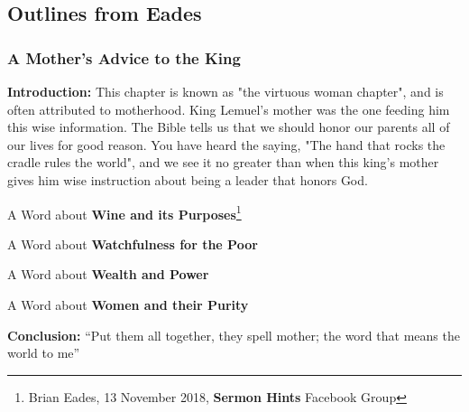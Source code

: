 \subsection{Outlines from Eades}


\subsubsection{A Mother's Advice to the King}

\textbf{Introduction: }This chapter is known as "the virtuous woman chapter", and is often attributed to motherhood. King Lemuel's mother was the one feeding him this wise information. The Bible tells us that we should honor our parents all of our lives for good reason. You have heard the saying, "The hand that rocks the cradle rules the world", and we see it no greater than when this king's mother gives him wise instruction about being a leader that honors God.
\begin{compactenum}[I.]
    \item A Word about \textbf{Wine and its Purposes}\footnote{Brian Eades, 13 November 2018, \textbf{Sermon Hints} Facebook Group}
    \item A Word about \textbf{Watchfulness for the Poor}
    \item A Word about \textbf{Wealth and Power}
    \item A Word about \textbf{Women and their Purity}
\end{compactenum}
\textbf{Conclusion: }``Put them all together, they spell mother; the word that means the world to me''


